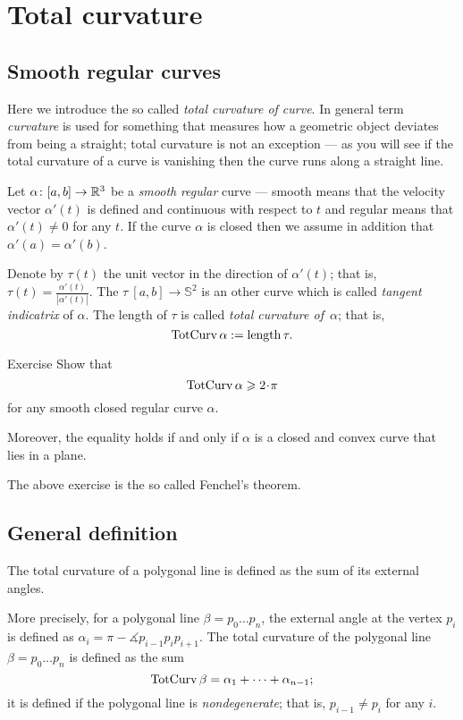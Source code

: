 \chapter{Total curvature}

\section{Smooth regular curves}\label{sec:total-curvature-smooth}

Here we introduce the so called \emph{total curvature of curve}.
In general term \emph{curvature} is used for something that measures how 
a geometric object deviates from being a straight;
total curvature is not an exception --- as you will see if the total curvature of a curve is vanishing then the curve runs along a straight line.


Let $\alpha\colon[a,b]\to\mathbb{R}^3$ be a \emph{smooth} \emph{regular} curve --- smooth means that
the velocity vector $\alpha'(t)$ is defined and continuous with respect to $t$ and regular means that $\alpha'(t)\ne 0$ for any $t$.
If the curve $\alpha$ is closed then we assume in addition that $\alpha'(a)=\alpha'(b)$.

Denote by $\tau(t)$ the unit vector in the direction of $\alpha'(t)$;
that is, $\tau(t)=\tfrac{\alpha'(t)}{|\alpha'(t)|}$.
The $\tau\:[a,b]\to\mathbb{S}^2$ is an other curve which is called \emph{tangent indicatrix} of $\alpha$.
The length of $\tau$ is called \emph{total curvature of}~$\alpha$;
that is,
\[\mathop{\rm TotCurv}\nolimits\alpha:=\mathop{\rm length}\nolimits\tau.\]

\begin{thm}{Exercise}\label{ex:fenchel}
Show that 
\[\tc\alpha\ge 2\cdot \pi\]
for any smooth closed regular curve $\alpha$.

Moreover, the equality holds if and only if $\alpha$ is a closed and convex curve that lies in a plane.
\end{thm}

The above exercise is the so called Fenchel's theorem.


\section{General definition}

The total curvature of a polygonal line is defined as the sum of its external angles.

More precisely, 
for a polygonal line $\beta=p_0\dots p_n$,
the external angle at the vertex $p_i$ is defined as $\alpha_i=\pi-\measuredangle p_{i-1}p_ip_{i+1}$.
The total curvature of the polygonal line $\beta=p_0\dots p_n$ is defined as the sum
\[\mathop{\rm TotCurv}\nolimits\beta=\alpha_1+\dots+\alpha_{n-1};\]
it is defined if the polygonal line is \emph{nondegenerate}; that is, $p_{i-1}\ne p_i$ for any $i$.

